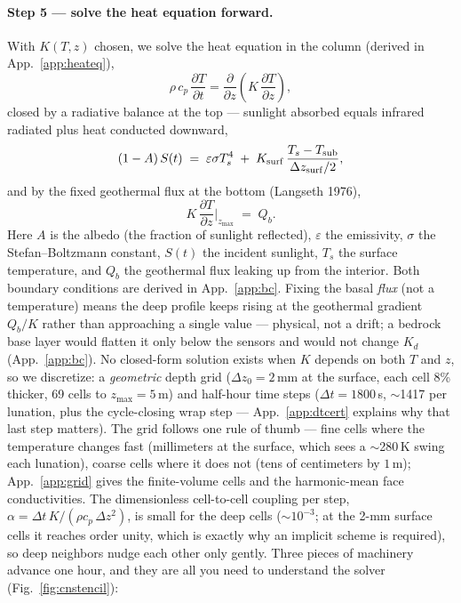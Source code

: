 \documentclass[11pt]{report}
\begin{document}
\paragraph{\textbf{Step 5 --- solve the heat equation forward.}}
With $K(T,z)$ chosen, we solve the heat equation in the column (derived in
App.~\ref{app:heateq}),
\begin{equation}
\rho\,c_p\,\frac{\partial T}{\partial t}
=\frac{\partial}{\partial z}\!\left(K\,\frac{\partial T}{\partial z}\right),
\label{eq:heat}
\end{equation}
closed by a radiative balance at the top --- sunlight absorbed equals infrared
radiated plus heat conducted downward,
\begin{equation}
(1-A)\,S(t) \;=\; \varepsilon\sigma T_s^4 \;+\; K_{\rm surf}\,\frac{T_s-T_{\rm sub}}{\Delta z_{\rm surf}/2},
\label{eq:surfbc}
\end{equation}
and by the fixed geothermal flux at the bottom (Langseth 1976),
\begin{equation}
K\,\frac{\partial T}{\partial z}\bigg|_{z_{\max}} \;=\; Q_b.
\label{eq:bottombc}
\end{equation}
Here $A$ is the albedo (the fraction of sunlight reflected), $\varepsilon$ the emissivity,
$\sigma$ the Stefan--Boltzmann constant, $S(t)$ the incident sunlight, $T_s$ the surface
temperature, and $Q_b$ the geothermal flux leaking up from the interior.
Both boundary conditions are derived in App.~\ref{app:bc}. Fixing the basal
\emph{flux} (not a temperature) means the deep profile keeps rising at the
geothermal gradient $Q_b/K$ rather than approaching a single value --- physical,
not a drift; a bedrock base layer would flatten it only below the sensors and
would not change $K_d$ (App.~\ref{app:bc}). No closed-form solution exists when
$K$ depends on both $T$ and $z$, so we discretize: a
\emph{geometric} depth grid ($\Delta z_0=2$\,mm at the surface, each cell 8\%
thicker, 69 cells to $z_{\max}=5$\,m) and half-hour time steps
($\Delta t=1800$\,s, $\sim$1417 per lunation, plus the cycle-closing wrap
step --- App.~\ref{app:dtcert} explains why that last step matters). The grid follows one rule of thumb --- fine cells where
the temperature changes fast (millimeters at the surface, which sees a
$\sim$280\,K swing each lunation), coarse cells where it does not (tens of
centimeters by $1$\,m); App.~\ref{app:grid} gives the finite-volume cells and the
harmonic-mean face conductivities. The dimensionless cell-to-cell coupling per step,
$\alpha=\Delta t\,K/(\rho c_p\,\Delta z^2)$, is small for the deep cells ($\sim10^{-3}$;
at the 2-mm surface cells it reaches order unity, which is exactly why an
implicit scheme is required), so deep neighbors nudge each other only gently. Three pieces of
machinery advance one hour, and they are all you need to understand the solver
(Fig.~\ref{fig:cnstencil}):
\end{document}
